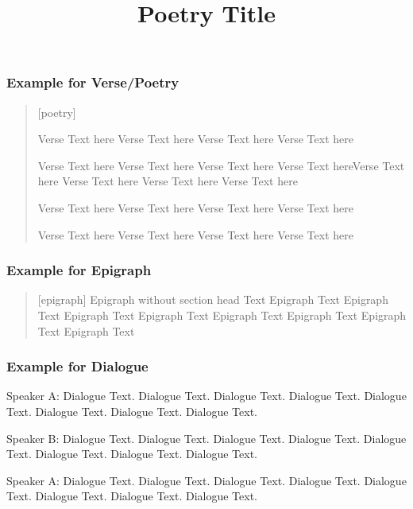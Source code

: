 \subsubsection*{Example for Verse/Poetry}

\begin{quote}[poetry]

\title{Poetry Title}

Verse Text here Verse Text here Verse Text here Verse Text here

Verse Text here Verse Text here Verse Text here Verse Text hereVerse Text here Verse Text here Verse Text here Verse Text here

Verse Text here Verse Text here Verse Text here Verse Text here

Verse Text here Verse Text here Verse Text here Verse Text here

\end{quote}

\subsubsection*{Example for Epigraph}

\begin{quote}[epigraph]
Epigraph  without section head Text  Epigraph  Text  Epigraph  Text  
Epigraph  Text Epigraph  Text Epigraph  Text Epigraph  Text  Epigraph  
Text  Epigraph  Text 
\end{quote}

\subsubsection*{Example for Dialogue}

\begin{dialogue}

\item[Speaker A:] Dialogue Text. Dialogue Text. Dialogue Text. Dialogue Text. Dialogue Text. Dialogue Text. Dialogue Text. Dialogue Text. 

\item[Speaker B:] Dialogue Text. Dialogue Text. Dialogue Text. Dialogue Text. Dialogue Text. Dialogue Text. Dialogue Text. Dialogue Text.

\item[Speaker A:] Dialogue Text. Dialogue Text. Dialogue Text. Dialogue Text. Dialogue Text. Dialogue Text. Dialogue Text. Dialogue Text.

\end{dialogue}

